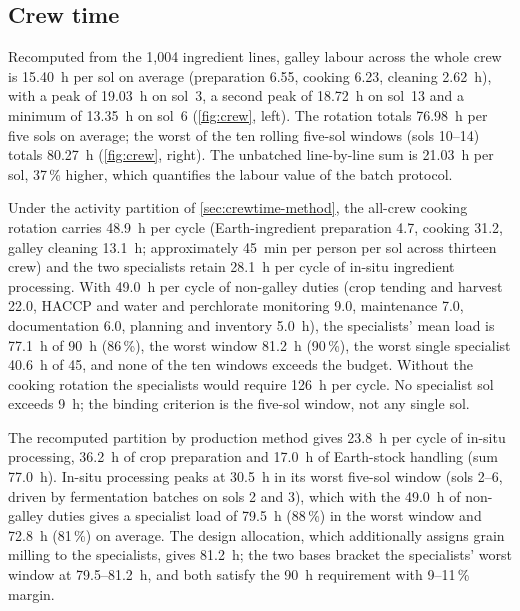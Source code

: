\documentclass[11pt,a4paper,3p,authoryear]{elsarticle}
\begin{document}
\subsection{Crew time}\label{sec:crewtime-results}

Recomputed from the 1,004 ingredient lines, galley labour across the whole crew is \SI{15.40}{\hour} per sol on average (preparation 6.55, cooking 6.23, cleaning \SI{2.62}{\hour}), with a peak of \SI{19.03}{\hour} on sol~3, a second peak of \SI{18.72}{\hour} on sol~13 and a minimum of \SI{13.35}{\hour} on sol~6 (\cref{fig:crew}, left). The rotation totals \SI{76.98}{\hour} per five sols on average; the worst of the ten rolling five-sol windows (sols 10--14) totals \SI{80.27}{\hour} (\cref{fig:crew}, right). The unbatched line-by-line sum is \SI{21.03}{\hour} per sol, 37\,\% higher, which quantifies the labour value of the batch protocol.

Under the activity partition of \cref{sec:crewtime-method}, the all-crew cooking rotation carries \SI{48.9}{\hour} per cycle (Earth-ingredient preparation 4.7, cooking 31.2, galley cleaning \SI{13.1}{\hour}; approximately \SI{45}{\minute} per person per sol across thirteen crew) and the two specialists retain \SI{28.1}{\hour} per cycle of in-situ ingredient processing. With \SI{49.0}{\hour} per cycle of non-galley duties (crop tending and harvest 22.0, HACCP and water and perchlorate monitoring 9.0, maintenance 7.0, documentation 6.0, planning and inventory \SI{5.0}{\hour}), the specialists' mean load is \SI{77.1}{\hour} of \SI{90}{\hour} (86\,\%), the worst window \SI{81.2}{\hour} (90\,\%), the worst single specialist \SI{40.6}{\hour} of 45, and none of the ten windows exceeds the budget. Without the cooking rotation the specialists would require \SI{126}{\hour} per cycle. No specialist sol exceeds \SI{9}{\hour}; the binding criterion is the five-sol window, not any single sol.

The recomputed partition by production method gives \SI{23.8}{\hour} per cycle of in-situ processing, \SI{36.2}{\hour} of crop preparation and \SI{17.0}{\hour} of Earth-stock handling (sum \SI{77.0}{\hour}). In-situ processing peaks at \SI{30.5}{\hour} in its worst five-sol window (sols 2--6, driven by fermentation batches on sols 2 and 3), which with the \SI{49.0}{\hour} of non-galley duties gives a specialist load of \SI{79.5}{\hour} (88\,\%) in the worst window and \SI{72.8}{\hour} (81\,\%) on average. The design allocation, which additionally assigns grain milling to the specialists, gives \SI{81.2}{\hour}; the two bases bracket the specialists' worst window at 79.5--\SI{81.2}{\hour}, and both satisfy the \SI{90}{\hour} requirement with 9--11\,\% margin.
\end{document}
